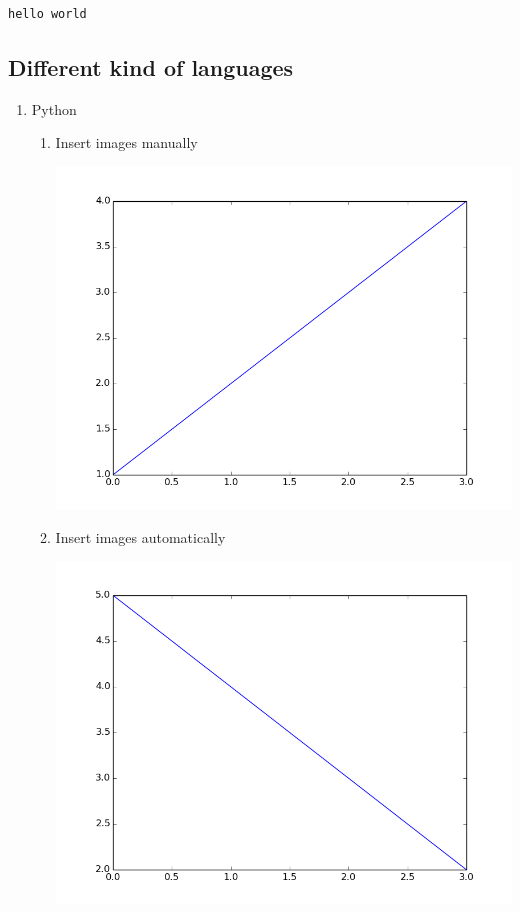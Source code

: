 \documentclass[11pt]{article}
\begin{document}
\begin{verbatim}
hello world
\end{verbatim}

\subsection{Different kind of languages}
\label{sec:orgc9a9935}


\begin{enumerate}
\item Python
\label{sec:orgb5a0ef1}

\begin{enumerate}
\item Insert images manually
\label{sec:org30d1150}
\begin{center}
\includegraphics[width=.9\linewidth]{./fig_manual.png}
\end{center}

\item Insert images automatically
\label{sec:orgf269e8f}
\begin{center}
\includegraphics[width=.9\linewidth]{fig_auto.png}
\end{center}
\end{enumerate}



\end{enumerate}
\end{document}
